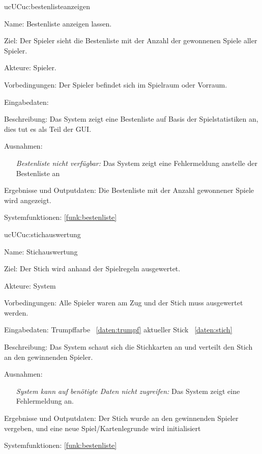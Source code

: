 \begin{description}[leftmargin=5em, style=sameline]
    \begin{lhp}{uc}{UC}{uc:bestenlisteanzeigen}
    \item [Name:] Bestenliste anzeigen lassen.
    \item [Ziel:] Der Spieler sieht die Bestenliste mit der Anzahl der gewonnenen Spiele aller Spieler.
    \item [Akteure:] Spieler.
    \item [Vorbedingungen:] Der Spieler befindet sich im Spielraum oder Vorraum.
    \item [Eingabedaten:]
    \item [Beschreibung:] Das System zeigt eine Bestenliste auf Basis der Spielstatistiken an, dies tut es als Teil der GUI.
    \item [Ausnahmen:] \hfill
        \begin{itemize}
            \item[] \textit{Bestenliste nicht verfügbar:} Das System zeigt eine Fehlermeldung anstelle der Bestenliste an
        \end{itemize}
    \item [Ergebnisse und Outputdaten:] Die Bestenliste mit der Anzahl gewonnener Spiele wird angezeigt.
    \item [Systemfunktionen:] \ref{funk:bestenliste}
    \end{lhp}

    \begin{lhp}{uc}{UC}{uc:stichauswertung}
    \item [Name:] Stichauswertung
    \item [Ziel:] Der Stich wird anhand der Spielregeln ausgewertet.
    \item [Akteure:] System
    \item [Vorbedingungen:] Alle Spieler waren am Zug und der Stich muss ausgewertet werden.
    \item [Eingabedaten:] Trumpffarbe ~\ref{daten:trumpf} aktueller Stick ~\ref{daten:stich} 
    \item [Beschreibung:] Das System schaut sich die Stichkarten an und verteilt den Stich an den gewinnenden Spieler.
    \item [Ausnahmen:] \hfill
        \begin{itemize}
            \item[] \textit{System kann auf benötigte Daten nicht zugreifen:} Das System zeigt eine Fehlermeldung an.
        \end{itemize}
    \item [Ergebnisse und Outputdaten:] Der Stich wurde an den gewinnenden Spieler vergeben, und eine neue Spiel/Kartenlegrunde wird initialisiert
    \item [Systemfunktionen:] \ref{funk:bestenliste}
    \end{lhp}
\end{description}